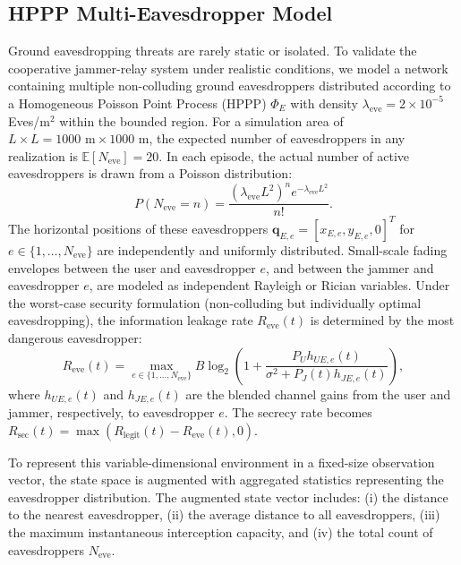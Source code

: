 \documentclass[journal,onecolumn]{IEEEtran}
\begin{document}
\subsection{HPPP Multi-Eavesdropper Model}
Ground eavesdropping threats are rarely static or isolated. To validate the cooperative jammer-relay system under realistic conditions, we model a network containing multiple non-colluding ground eavesdroppers distributed according to a Homogeneous Poisson Point Process (HPPP) $\Phi_E$ with density $\lambda_{\text{eve}} = 2 \times 10^{-5}$ Eves/m$^2$ within the bounded region. For a simulation area of $L \times L = 1000\text{ m} \times 1000\text{ m}$, the expected number of eavesdroppers in any realization is $\mathbb{E}[N_{\text{eve}}] = 20$. In each episode, the actual number of active eavesdroppers is drawn from a Poisson distribution:
\begin{equation}
    P(N_{\text{eve}} = n) = \frac{(\lambda_{\text{eve}} L^2)^n e^{-\lambda_{\text{eve}} L^2}}{n!}.
\end{equation}
The horizontal positions of these eavesdroppers $\mathbf{q}_{E,e} = [x_{E,e}, y_{E,e}, 0]^T$ for $e \in \{1, \dots, N_{\text{eve}}\}$ are independently and uniformly distributed. Small-scale fading envelopes between the user and eavesdropper $e$, and between the jammer and eavesdropper $e$, are modeled as independent Rayleigh or Rician variables. Under the worst-case security formulation (non-colluding but individually optimal eavesdropping), the information leakage rate $R_{\text{eve}}(t)$ is determined by the most dangerous eavesdropper:
\begin{equation}
    R_{\text{eve}}(t) = \max_{e \in \{1, \dots, N_{\text{eve}}\}} B \log_2\left(1 + \frac{P_U h_{UE,e}(t)}{\sigma^2 + P_J(t) h_{JE,e}(t)}\right),
\end{equation}
where $h_{UE,e}(t)$ and $h_{JE,e}(t)$ are the blended channel gains from the user and jammer, respectively, to eavesdropper $e$. The secrecy rate becomes $R_{\text{sec}}(t) = \max\left(R_{\text{legit}}(t) - R_{\text{eve}}(t), 0\right)$.

To represent this variable-dimensional environment in a fixed-size observation vector, the state space is augmented with aggregated statistics representing the eavesdropper distribution. The augmented state vector includes: (i) the distance to the nearest eavesdropper, (ii) the average distance to all eavesdroppers, (iii) the maximum instantaneous interception capacity, and (iv) the total count of eavesdroppers $N_{\text{eve}}$.
\end{document}
